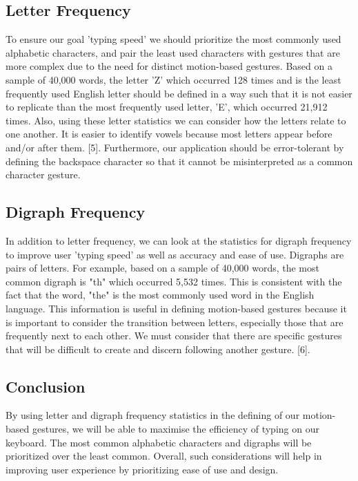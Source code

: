 \documentclass[onecolumn, draftclsnofoot,10pt, journal, letterpaper]{IEEEtran}
\begin{document}
\subsection{Letter Frequency}
To ensure our goal 'typing speed' we should prioritize the most commonly used alphabetic characters, and pair the least used characters with gestures that are more complex due to the need for distinct motion-based gestures. Based on a sample of 40,000 words, the letter 'Z' which occurred 128 times and is the least frequently used English letter should be defined in a way such that it is not easier to replicate than the most frequently used letter, 'E', which occurred 21,912 times. Also, using these letter statistics we can consider how the letters relate to one another. It is easier to identify vowels because most letters appear before and/or after them. [5]. Furthermore, our application should be error-tolerant by defining the backspace character so that it cannot be misinterpreted as a common character gesture.
\subsection{Digraph Frequency}
In addition to letter frequency, we can  look at the statistics for digraph frequency to improve user 'typing speed' as well as accuracy and ease of use. Digraphs are pairs of letters. For example, based on a sample of 40,000 words, the most common digraph is "th" which occurred 5,532 times. This is consistent with the fact that the word, "the" is the most commonly used word in the English language. This information is useful in defining motion-based gestures because it is important to consider the transition between letters, especially those that are frequently next to each other. We must consider that there are specific gestures that will be difficult to create and discern following another gesture. [6].
\subsection{Conclusion}
By using letter and digraph frequency statistics in the defining of our motion-based gestures, we will be able to maximise the efficiency of typing on our keyboard. The most common alphabetic characters and digraphs will be prioritized over the least common. Overall, such considerations will help in improving user experience by prioritizing ease of use and design.

\pagebreak
\end{document}
